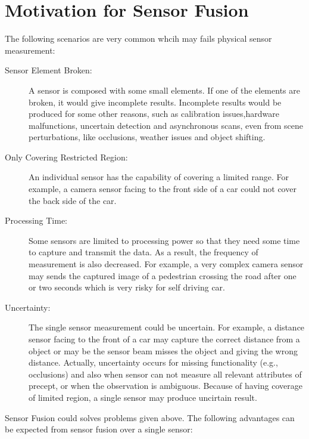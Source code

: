 \section{Motivation for Sensor Fusion}
The following scenarios are very common whcih may fails physical sensor measurement\cite{Wilfried2002}:
\begin{description}
    \item[Sensor Element Broken:] A sensor is composed with some small elements. If one of the elements are broken, it would give incomplete results. Incomplete results would be produced for some other reasons, such as calibration issues,hardware malfunctions, uncertain detection and asynchronous scans, even from scene perturbations, like occlusions, weather issues and object shifting.
    \item[Only Covering Restricted Region:] An individual sensor has the capability of covering a limited range. For example, a camera sensor facing to the front side of a car could not cover the back side of the car.
    \item[Processing Time:] Some sensors are limited to processing power so that they need some time to capture and transmit the data. As a result, the frequency of measurement is also decreased. For example, a very complex camera sensor may sends the captured image of a pedestrian crossing the road after one or two seconds which is very risky for self driving car.
    \item[Uncertainty:] The single sensor measurement could be uncertain. For example, a distance sensor facing to the front of a car may capture the correct distance from a object or may be the sensor beam misses the object and giving the wrong distance. Actually, uncertainty occurs for missing functionality (e.g., occlusions) and also when sensor can not measure all relevant attributes of precept, or when the observation is ambiguous\cite{Wilfried2002}. Because of having coverage of limited region, a single sensor may produce uncirtain result\cite{Wilfried2002}.
\end{description}
Sensor Fusion could solves problems given above. The following advantages can be expected from sensor fusion over a single sensor\cite{Wilfried2002}:
